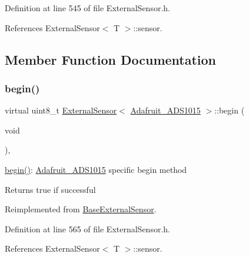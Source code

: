 Definition at line 545 of file External\+Sensor.\+h.



References External\+Sensor$<$ T $>$\+::sensor.



\subsection{Member Function Documentation}
\mbox{\label{class_external_sensor_3_01_adafruit___a_d_s1015_01_4_adb62166ec1ff937acd82650ff44320d6}} 
\subsubsection{\texorpdfstring{begin()}{begin()}}
{\footnotesize\ttfamily virtual uint8\+\_\+t \hyperlink{class_external_sensor}{External\+Sensor}$<$ \hyperlink{class_adafruit___a_d_s1015}{Adafruit\+\_\+\+A\+D\+S1015} $>$\+::begin (\begin{DoxyParamCaption}\item[{void}]{ }\end{DoxyParamCaption})\hspace{0.3cm}{\ttfamily [inline]}, {\ttfamily [virtual]}}

\hyperlink{class_external_sensor_3_01_adafruit___a_d_s1015_01_4_adb62166ec1ff937acd82650ff44320d6}{begin()}\+: \hyperlink{class_adafruit___a_d_s1015}{Adafruit\+\_\+\+A\+D\+S1015} specific begin method

\begin{DoxyReturn}{Returns}
true if successful 
\end{DoxyReturn}


Reimplemented from \hyperlink{class_base_external_sensor_a87d132803d4f4fdd4e66332809f0c9a0}{Base\+External\+Sensor}.



Definition at line 565 of file External\+Sensor.\+h.



References External\+Sensor$<$ T $>$\+::sensor.

\mbox{\label{class_external_sensor_3_01_adafruit___a_d_s1015_01_4_a6c41a80525743b24bcc64744bbfb91bb}} 
